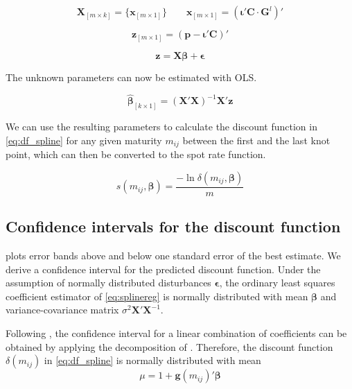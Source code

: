 \begin{equation*}
\bm{X}_{\left[m \times k\right]}=\{ \bm{x}_{\left[m \times 1\right]} \} \qquad  \bm{x}_{\left[m \times 1\right]} = \left( \bm{\iota}'\bm{C}\cdot\bm{G}^l\right)'
\end{equation*}


\begin{equation*}
\bm{z}_{\left[m \times 1\right]}= \left(\bm{p}-\bm{\iota}'\bm{C}\right)'
\end{equation*}
       

\begin{equation}
\label{eq:splinereg}
    \bm{z}=\bm{X}\bm{\beta}+\bm{\epsilon}
\end{equation}
          
The unknown parameters can now be estimated with OLS.
	
\begin{equation*}
\label{eq:paramspline}
\bm{\hat \beta}_{\left[k\times 1\right]}= \left( \bm{X}' \bm{X}\right )^{-1}\bm{X}' \bm{z}
\end{equation*}

We can use the resulting parameters to calculate the discount function in \eqref{eq:df_spline} for any given maturity $m_{ij}$ between the first and the last knot point, which can then be converted to the spot rate function.

\begin{equation*}
  \label{eq:transformdf}
  s(m_{ij},\bm{\beta}) = \frac{-\ln \delta(m_{ij},\bm{\beta})}{m}
\end{equation*}


\subsection{Confidence intervals for the discount function}

\cite{McCulloch1975} plots error bands above and below one standard error of the best estimate. We derive a confidence interval for the predicted discount function. Under the assumption of normally distributed disturbances $\bm{\epsilon}$, the ordinary least squares coefficient estimator of \eqref{eq:splinereg} is normally distributed with mean $\bm{\beta}$ and variance-covariance matrix $\sigma^2\bm{X}'\bm{X}^{-1}$. 

Following \cite{Greene2002}, the confidence interval for a linear combination of coefficients can be obtained by applying the decomposition of \cite{Oaxaca1973}. Therefore, the discount function $\delta(m_{ij})$ in \eqref{eq:df_spline} is normally 
distributed with mean
\begin{equation*}
\mu = 1+\bm{g}(m_{ij})'\bm{\beta}
\end{equation*}

